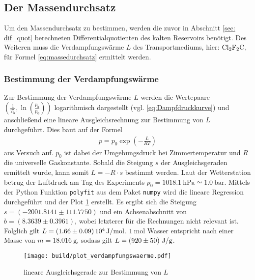 \subsection[]{Der Massendurchsatz}
Um den Massendurchsatz zu bestimmen, werden die zuvor in Abschnitt \ref{sec: dif_quot}
berechneten Differentialquotienten des kalten Reservoirs benötigt.
Des Weiteren muss die Verdampfungswärme $L$ des Transportmediums, hier: $\ce{Cl2F2C}$, für Formel \eqref{eq:massedurchsatz} ermittelt werden.


\subsubsection[]{Bestimmung der Verdampfungswärme}
Zur Bestimmung der Verdampfungswärme $L$ werden die Wertepaare $\left(\frac{1}{T_{\text{k}}}, \ln{\left(\frac{p_{\text{k}}}{p_0}\right)}\right)$ logarithmisch dargestellt (vgl. \eqref{eq:Dampfdruckkurve})
und anschließend eine lineare Ausgleichsrechnung zur Bestimmung von $L$ durchgeführt.
Dies baut auf der Formel 
\begin{align*}
    p = p_0 \exp{\left(-\frac{L}{RT}\right)}
\end{align*}
aus Versuch \cite[]{man:v203} auf.
$p_0$ ist dabei der Umgebungsdruck bei Zimmertemperatur und $R$ die universelle Gaskonstante.
Sobald die Steigung $s$ der Ausgleichsgeraden ermittelt wurde, kann somit $L = -R \cdot s$ bestimmt werden.
Laut der Wetterstation \cite*[][]{wetterstation} betrug der Luftdruck am Tag des Experiments
$p_0 = \qty[]{1018.1}{\hecto\pascal} \simeq \qty[]{1.0}{\bar}$.
Mittels der Python \cite[]{python} Funktion \texttt{polyfit} aus dem Paket \texttt{numpy} \cite[]{numpy} wird die lineare Regression durchgeführt und
der Plot \ref{fig:ausgleichsgerade} erstellt.
Es ergibt sich die Steigung $s = \left(\num[]{-2001.8141}\pm \num[]{111.7750} \right)$ und ein Achsenabschnitt von 
$b = \left( \num[]{8.3639} \pm \num[]{0.3961} \right)$, 
wobei letzterer für die Rechnungen nicht relevant ist. 
Folglich gilt $L = \left(1.66 \pm 0.09 \right) 10^{4} \, \unit[]{\joule\per\mol}$. 
$\qty[]{1}{\mol}$ Wasser entspricht nach \cite[]{chemie_schule} einer Masse von $m = \qty[]{18.016}{\gram}$, sodass gilt 
$L = \left(920 \pm 50 \right) \, \unit[]{\joule\per\gram}$.
\begin{figure}
    \texttt{[image: build/plot\_verdampfungswaerme.pdf]}
    \caption[]{lineare Ausgleichsgerade zur Bestimmung von $L$}
    \label{fig:ausgleichsgerade}
\end{figure}

